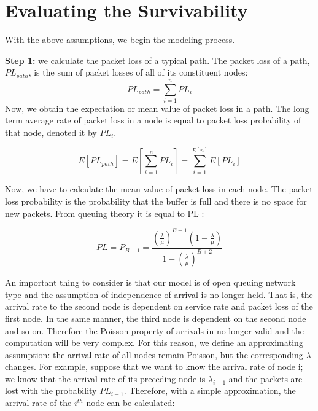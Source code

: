 \documentclass[onecolumn,conference]{IEEEtran}
\begin{document}
    \section{Evaluating the Survivability} \label{sec:eval}
    With the above assumptions, we begin the modeling process.

    \textbf{Step 1:} we calculate the packet loss of a typical path. The packet loss of a path, $PL_{path}$, is the sum of packet losses of all of its constituent nodes:
    \begin{equation}
        PL_{path}=\sum_{i=1}^nPL_i
    \end{equation}
    Now, we obtain the expectation or mean value of packet loss in a path. The long term average rate of packet loss in a node is equal to packet loss probability of that node, denoted it by $PL_i$.

    \begin{equation}
        E\left[PL_{path}\right]=E\left[\sum_{i=1}^nPL_i\right]=\sum_{i=1}^{E\left[n\right]}E\left[PL_i\right]
    \end{equation}

    Now, we have to calculate the mean value of packet loss in each node. The packet loss probability is the probability that the buffer is full and there is no space for new packets. From queuing theory it is equal to PL \cite{b4}:

    \begin{equation}
        PL=P_{B+1}=\frac{{\left(\frac{\lambda}{\mu}\right)^{B+1}}{\left(1-\frac{\lambda}{\mu}\right)} }
        {{1-\left(\frac{\lambda}{\mu}\right)}^{B+2}}
    \end{equation}

    An important thing to consider is that our model is of open queuing network type and the assumption of independence of arrival is no longer held. That is, the arrival rate to the second node is dependent on service rate and packet loss of the first node. In the same manner, the third node is dependent on the second node and so on. Therefore the Poisson property of arrivals in no longer valid and the computation will be very complex. For this reason, we define an approximating assumption: the arrival rate of all nodes remain Poisson, but the corresponding $\lambda$ changes. For example, suppose that we want to know the arrival rate of node i; we know that the arrival rate of its preceding node is $\lambda_{i-1}$ and the packets are lost with the probability $PL_{i-1}$. Therefore, with a simple approximation, the arrival rate of the $i^{th}$ node can be calculated:
\end{document}
